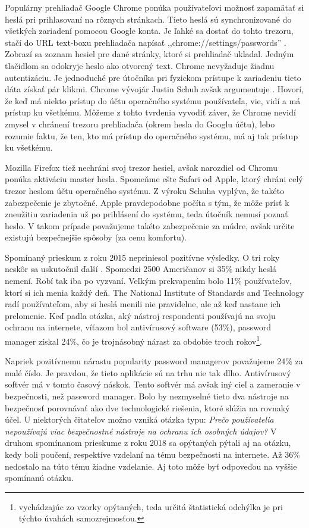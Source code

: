 Populárny prehliadač Google Chrome ponúka používateľovi možnosť zapamätať si heslá pri prihlasovaní na rôznych stránkach. Tieto heslá sú synchronizované do všetkých zariadení pomocou Google konta. Je ľahké sa dostať do tohto trezoru, stačí do URL text-boxu prehliadača napísať ,,chrome://settings/passwords'' \cite{chrome_passw}. Zobrazí sa zoznam hesiel pre dané stránky, ktoré si prehliadač ukladal. Jedným tlačidlom sa odokryje heslo ako otvorený text. Chrome nevyžaduje žiadnu autentizáciu. Je jednoduché pre útočníka pri fyzickom prístupe k zariadeniu tieto dáta získať pár klikmi. Chrome vývojár Justin Schuh avšak argumentuje \cite{chrome_passw}. Hovorí, že keď má niekto prístup do účtu operačného systému používateľa, vie, vidí a má prístup ku všetkému. Môžeme z tohto tvrdenia vyvodiť záver, že Chrome nevidí zmysel v chránení trezoru prehliadača (okrem hesla do Googlu účtu), lebo rozumie faktu, že ten, kto má prístup do operačného systému, má aj tak prístup ku všetkému.

Mozilla Firefox tiež nechráni svoj trezor hesiel, avšak narozdiel od Chromu ponúka aktiváciu master hesla. Spomeňme ešte Safari od Apple, ktorý chráni celý trezor heslom účtu operačného systému. Z výroku Schuha vyplýva, že takéto zabezpečenie je zbytočné. Apple pravdepodobne počíta s tým, že môže prísť k zneužitiu zariadenia už po prihlásení do systému, teda útočník nemusí poznať heslo. V takom prípade považujeme takéto zabezpečenie za múdre, avšak určite existujú bezpečnejšie spôsoby (za cenu komfortu).

Spomínaný prieskum z roku 2015 nepriniesol pozitívne výsledky. O tri roky neskôr sa uskutočnil ďalší \cite{survey2}. Spomedzi 2500 Američanov si 35\% nikdy heslá nemení. Robí tak iba po vyzvaní. Veľkým prekvapením bolo 11\% používateľov, ktorí si ich menia každý deň. The National Institute of Standards and Technology radí používateľom, aby si heslá menili nie pravidelne, ale až keď nastane ich prelomenie. Keď padla otázka, aký nástroj respondenti používajú na svoju ochranu na internete, víťazom bol antivírusový software (53\%), password manager získal 24\%, čo je trojnásobný nárast za obdobie troch rokov\footnote{vychádzajúc zo vzorky opýtaných, teda určitá štatistická odchýlka je pri týchto úvahách samozrejmosťou.}.

Napriek pozitívnemu nárastu popularity password managerov považujeme 24\% za malé číslo. Je pravdou, že tieto aplikácie sú na trhu nie tak dlho. Antivírusový softvér má v tomto časový náskok. Tento softvér má avšak iný cieľ a zameranie v bezpečnosti, než password manager. Bolo by nezmyselné tieto dva nástroje na bezpečnosť porovnávať ako dve technologické riešenia, ktoré slúžia na rovnaký účel. U niektorých čitateľov možno vzniká otázka typu: \textit{Prečo používatelia nepoužívajú viac bezpečnostné nástroje na ochranu ich osobných údajov?} V druhom spomínanom prieskume z roku 2018 sa opýtaných pýtali aj na otázku, kedy boli poučení, respektíve vzdelaní na tému bezpečnosti na internete. Až 36\% nedostalo na túto tému žiadne vzdelanie. Aj toto môže byť odpoveďou na vyššie spomínanú otázku.

